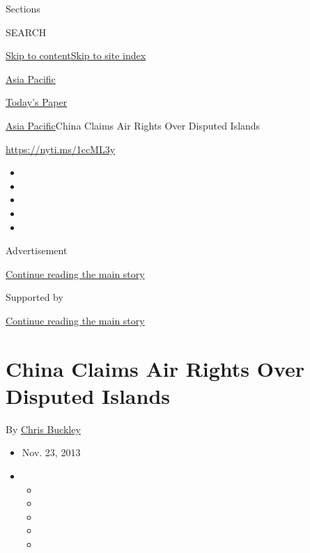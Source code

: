 Sections

SEARCH

\protect\hyperlink{site-content}{Skip to
content}\protect\hyperlink{site-index}{Skip to site index}

\href{https://www.nytimes3xbfgragh.onion/section/world/asia}{Asia
Pacific}

\href{https://myaccount.nytimes3xbfgragh.onion/auth/login?response_type=cookie\&client_id=vi}{}

\href{https://www.nytimes3xbfgragh.onion/section/todayspaper}{Today's
Paper}

\href{/section/world/asia}{Asia Pacific}\textbar{}China Claims Air
Rights Over Disputed Islands

\url{https://nyti.ms/1ccML3y}

\begin{itemize}
\item
\item
\item
\item
\item
\end{itemize}

Advertisement

\protect\hyperlink{after-top}{Continue reading the main story}

Supported by

\protect\hyperlink{after-sponsor}{Continue reading the main story}

\hypertarget{china-claims-air-rights-over-disputed-islands}{%
\section{China Claims Air Rights Over Disputed
Islands}\label{china-claims-air-rights-over-disputed-islands}}

By \href{https://www.nytimes3xbfgragh.onion/by/chris-buckley}{Chris
Buckley}

\begin{itemize}
\item
  Nov. 23, 2013
\item
  \begin{itemize}
  \item
  \item
  \item
  \item
  \item
  \end{itemize}
\end{itemize}

